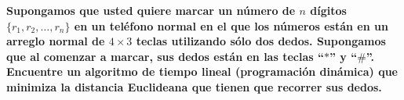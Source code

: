 \textbf{Supongamos que usted quiere marcar un n\'umero de $n$ d\'igitos $\{r_1, r_2, \dots, r_n\}$ en un tel\'efono normal en el que los n\'umeros est\'an en un arreglo normal de $4 \times 3$ teclas utilizando s\'olo dos dedos. Supongamos que al comenzar a marcar, sus dedos est\'an en las teclas ``$*$'' y ``$\#$''. Encuentre un algoritmo de tiempo lineal (programaci\'on din\'amica) que minimiza la distancia Euclideana que tienen que recorrer sus dedos.}\vspace{.2cm}

\textcolor{bibi}{}
\begin{quote}
\end{quote}
